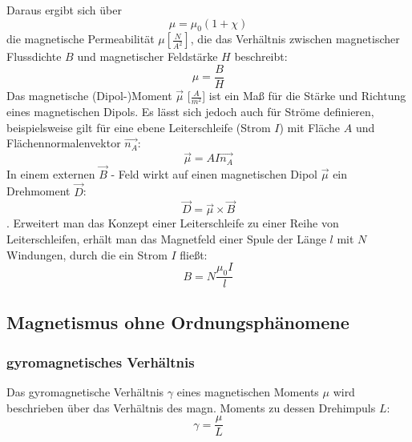             Daraus ergibt sich über
            \begin{equation}
                \mu = \mu_0 (1 + \chi)
            \end{equation}
            die magnetische Permeabilität $\mu [\frac{N}{A^2}]$, die das Verhältnis zwischen magnetischer Flussdichte $B$ und magnetischer Feldstärke $H$ beschreibt:
            $$ \mu = \frac{B}{H}$$
            Das magnetische (Dipol-)Moment $\vec{\mu}$ [$\frac{A}{m^2}$] ist ein Maß für die Stärke
            und Richtung eines magnetischen Dipols. Es lässt sich jedoch auch für Ströme definieren, beispielsweise gilt für eine ebene
            Leiterschleife (Strom $I$) mit Fläche $A$ und Flächennormalenvektor $\vec{n_A}$:
            \begin{equation}
                \vec{\mu} = A I \vec{n_A}
            \end{equation}
            In einem externen $\vec{B}$ - Feld wirkt auf einen magnetischen Dipol $\vec{\mu}$ ein Drehmoment $\vec{D}$:
            \begin{equation}
                \vec{D} = \vec{\mu} \times \vec{B}
            \end{equation}.
            Erweitert man das Konzept einer Leiterschleife zu einer Reihe von Leiterschleifen, erhält man das Magnetfeld einer Spule der Länge $l$ mit $N$ Windungen, durch die ein Strom $I$ fließt:
            \begin{equation}
                B = N \frac{\mu_0 I}{l}
            \end{equation}
    \subsection{Magnetismus ohne Ordnungsphänomene}
        \subsubsection*{gyromagnetisches Verhältnis}
            Das gyromagnetische Verhältnis $\gamma$ eines magnetischen Moments $\mu$ wird beschrieben über das Verhältnis
            des magn. Moments zu dessen Drehimpuls $L$:
            \begin{equation}
                \gamma = \frac{\mu}{L}
            \end{equation}
